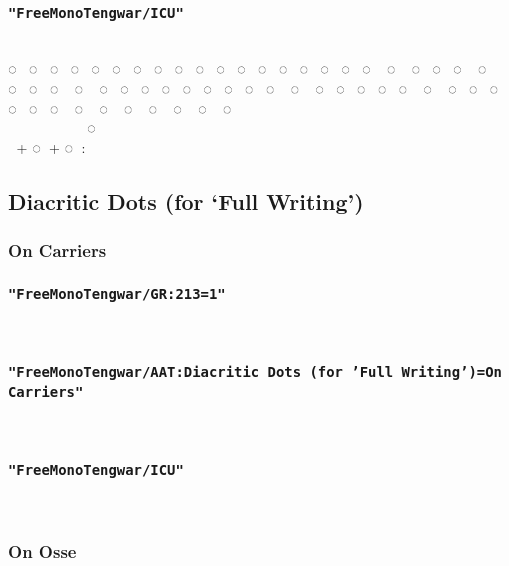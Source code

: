 \documentclass{article}
\begin{document}
\subsubsection*{\texttt{"FreeMonoTengwar/ICU"}}

\freeICU
                          \\
◌ ◌ ◌ ◌ ◌ ◌ ◌ ◌ ◌ ◌ ◌ ◌ ◌ ◌ ◌ ◌ ◌ ◌ ◌ ◌ ◌ ◌ ◌ ◌ ◌ ◌ ◌ ◌ ◌ ◌ ◌ ◌ ◌ ◌ ◌ ◌ ◌ ◌ ◌ ◌ ◌ ◌ ◌ ◌ ◌ ◌ ◌ ◌ ◌ ◌ ◌ ◌ ◌ ◌ ◌ ◌\\
      ◌‍ ‍ ‍ ‍ \\
 \normalfont + \freeICU ◌ \normalfont + \freeICU ◌ : 


\newpage

\subsection{Diacritic Dots (for ‘Full Writing’)}

\subsubsection{On Carriers}

\subsubsection*{\texttt{"FreeMonoTengwar/GR:213=1"}}

\carriersGR    

\subsubsection*{\texttt{"FreeMonoTengwar/AAT:Diacritic Dots (for 'Full Writing')=On Carriers"}}

\carriersAAT    

\subsubsection*{\texttt{"FreeMonoTengwar/ICU"}}

\freeICU     


\subsubsection{On Osse}
\end{document}
